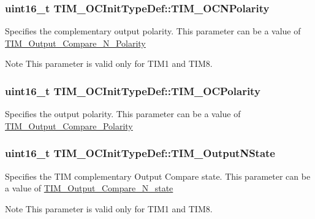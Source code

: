 \hypertarget{structTIM__OCInitTypeDef_a3e47e672810747302c9d0626ae2ccb17}{
\subsubsection[{TIM\_\-OCNPolarity}]{\setlength{\rightskip}{0pt plus 5cm}uint16\_\-t {\bf TIM\_\-OCInitTypeDef::TIM\_\-OCNPolarity}}}
\label{structTIM__OCInitTypeDef_a3e47e672810747302c9d0626ae2ccb17}
Specifies the complementary output polarity. This parameter can be a value of \hyperlink{group__TIM__Output__Compare__N__Polarity}{TIM\_\-Output\_\-Compare\_\-N\_\-Polarity} \begin{DoxyNote}{Note}
This parameter is valid only for TIM1 and TIM8. 
\end{DoxyNote}
\hypertarget{structTIM__OCInitTypeDef_a9ed3e2de4700d008729a916d8ba78486}{
\subsubsection[{TIM\_\-OCPolarity}]{\setlength{\rightskip}{0pt plus 5cm}uint16\_\-t {\bf TIM\_\-OCInitTypeDef::TIM\_\-OCPolarity}}}
\label{structTIM__OCInitTypeDef_a9ed3e2de4700d008729a916d8ba78486}
Specifies the output polarity. This parameter can be a value of \hyperlink{group__TIM__Output__Compare__Polarity}{TIM\_\-Output\_\-Compare\_\-Polarity} \hypertarget{structTIM__OCInitTypeDef_a933904d2f892d0b945a908b9257fe869}{
\subsubsection[{TIM\_\-OutputNState}]{\setlength{\rightskip}{0pt plus 5cm}uint16\_\-t {\bf TIM\_\-OCInitTypeDef::TIM\_\-OutputNState}}}
\label{structTIM__OCInitTypeDef_a933904d2f892d0b945a908b9257fe869}
Specifies the TIM complementary Output Compare state. This parameter can be a value of \hyperlink{group__TIM__Output__Compare__N__state}{TIM\_\-Output\_\-Compare\_\-N\_\-state} \begin{DoxyNote}{Note}
This parameter is valid only for TIM1 and TIM8. 
\end{DoxyNote}
